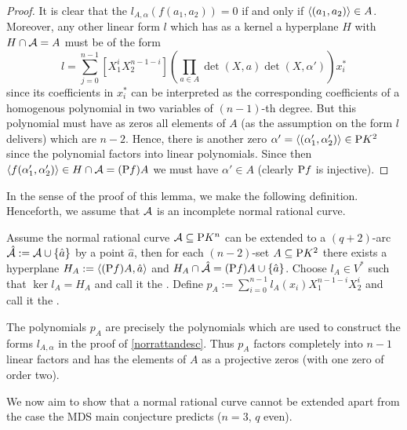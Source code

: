 \begin{proof}
    It is clear that the $l_{A,\alpha}(f(a_1,a_2))=0$ if and only if $\gen{(a_1,a_2)}\in A$. Moreover, any other linear form $l$ which has as a kernel a hyperplane $H$ with $H\cap\mathcal{A}=A$ must be of the form
    $$
    l=\sum_{j=0}^{n-1}{[X_1^i X_2^{n-1-i}]\left(\prod_{a\in A}{\det(X,a)}\det(X,\alpha')\right)x_i^{\ast}}
    $$
    since its coefficients in $x_i^{\ast}$ can be interpreted as the corresponding coefficients of a homogenous polynomial in two variables of $(n-1)$-th degree. But this polynomial must have as zeros all elements of $A$ (as the assumption on the form $l$ delivers) which are $n-2$. Hence, there is another zero $\alpha'=\gen{(\alpha'_1,\alpha'_2)}\in\proj{K^2}$ since the polynomial factors into linear polynomials. Since then $\gen{f(\alpha'_1,\alpha'_2)}\in H\setmeet\cA=(\proj f) A$ we must have $\alpha'\in A$ (clearly $\mathrm{P} f$ is injective).
\end{proof}

In the sense of the proof of this lemma, we make the following definition.
Henceforth, we assume that $\mathcal{A}$ is an incomplete normal rational curve.

\begin{definition}
    Assume the normal rational curve $\mathcal{A}\subseteq \mathrm{P}{K^n}$ can be extended to a $(q+2)$-arc $\hat{\mathcal{A}}:=\mathcal{A}\cup\left\{\hat{a}\right\}$ by a point $\hat{a}$, then for each $(n-2)$-set $A\subseteq\mathrm{P}{K^2}$ there exists a hyperplane $H_A:=\gen{(\proj f)A,\hat{a}}$ and $H_A\cap \hat{\mathcal{A}}=(\mathrm{P} f)A\cup\left\{\hat{a}\right\}$. Choose $l_A\in V^{\ast}$ such that $\ker{l_A}=H_A$ and call it the .
    Define $p_A:=\sum_{i=0}^{n-1}{l_A(x_i)X_1^{n-1-i}X_2^i}$ and call it the .
\end{definition}

\begin{remark}
    The polynomials $p_A$ are precisely the polynomials which are used to construct the forms $l_{A,\alpha}$ in the proof of \autoref{norrattandesc}. Thus $p_A$ factors completely into $n-1$ linear factors and has the elements of $A$ as a projective zeros (with one zero of order two).
\end{remark}

We now aim to show that a normal rational curve cannot be extended apart from the case the MDS main conjecture predicts ($n=3$, $q$ even).

